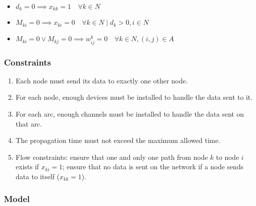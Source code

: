 \begin{itemize}
	\item $d_k = 0 \implies x_{kk} = 1 \quad \forall k \in N$
	\item $M_{ki} = 0 \implies x_{ki} = 0 \quad \forall k \in N \mid d_k > 0, i \in N$
	\item $M_{ki} = 0 \vee M_{kj} = 0 \implies w_{ij}^k = 0 \quad \forall k \in N, (i, j) \in A$
\end{itemize}

\subsubsection*{Constraints}

\begin{enumerate}
	\item Each node must send its data to exactly one other node.
	\item For each node, enough devices must be installed to handle the data sent to it.
	\item For each arc, enough channels must be installed to handle the data sent on that arc.
	\item The propagation time must not exceed the maximum allowed time.
	\item Flow constraints: ensure that one and only one path from node $k$ to node $i$ exists if $x_{ki} = 1$; ensure that no data is sent on the network if a node sends data to itself ($x_{kk} = 1$).
\end{enumerate}

\subsubsection*{Model}

